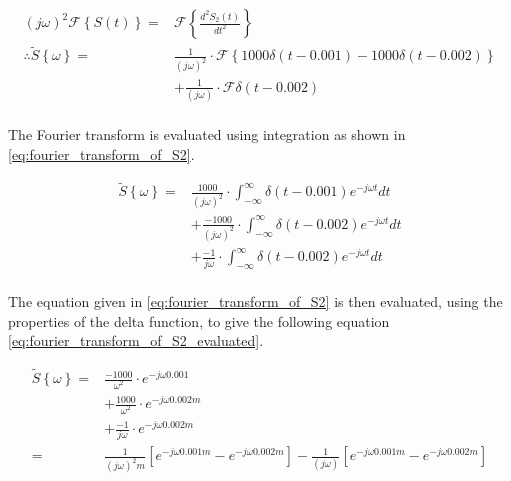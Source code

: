 \begin{equation}
	\begin{split}
		\left(j\omega\right)^{2} \mathcal{F}\left\{S\left(t\right)\right\} =& \mathcal{F}\left\{\frac{d^{2}S_{2}\left(t\right)}{dt^{2}}\right\}\\
		\therefore \widetilde{S} \left\{\omega\right\} =& \frac{1}{\left(j\omega\right)^{2}} \cdot \mathcal{F}\left\{1000\delta\left(t - 0.001\right) - 1000\delta\left(t - 0.002\right)\right\}\\
		&+ \frac{1}{\left(j\omega\right)} \cdot \mathcal{F}\delta\left(t - 0.002\right)\\
	\end{split}
	\label{eq:derivative_theorem}
\end{equation}

The Fourier transform is evaluated using integration as shown in \eqref{eq:fourier_transform_of_S2}. 

\begin{equation}
	\begin{split}
		\widetilde{S} \left\{\omega\right\}
		=& \frac{1000}{\left(j\omega\right)^{2}} \cdot \int_{-\infty}^{\infty}\delta\left(t - 0.001\right)e^{-j\omega t}dt\\
		&  + \frac{-1000}{\left(j\omega\right)^{2}}\cdot  \int_{-\infty}^{\infty}\delta\left(t - 0.002\right)e^{-j\omega t}dt\\
		&  + \frac{-1}{j\omega} \cdot \int_{-\infty}^{\infty}\delta\left(t - 0.002\right)e^{-j\omega t}dt\\
	\end{split}
	\label{eq:fourier_transform_of_S2}
\end{equation}

The equation given in \eqref{eq:fourier_transform_of_S2} is then evaluated, using the properties of the delta function, to give the following equation \eqref{eq:fourier_transform_of_S2_evaluated}. 

\begin{equation}
	\begin{split}
		\widetilde{S} \left\{\omega\right\} =& \frac{-1000} {\omega^2} \cdot e^{-j\omega 0.001}\\
		& + \frac{1000} {\omega^2}  \cdot e^{-j\omega 0.002m}\\
		& + \frac{-1} {j\omega}  \cdot e^{-j\omega 0.002m}\\
		=& \frac{1}{\left(j \omega\right)^{2} m}\left[e^{-j\omega 0.001m} - e^{-j\omega 0.002m}\right] - \frac{1}{\left(j \omega\right)}\left[e^{-j\omega 0.001m} - e^{-j\omega 0.002m}\right]\\
		\label{eq:fourier_transform_of_S2_evaluated}
	\end{split}
\end{equation}

